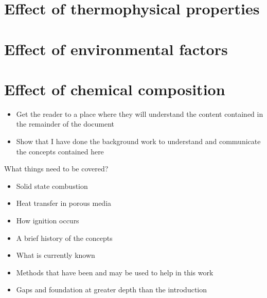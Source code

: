     \section{Effect of thermophysical properties}
    \section{Effect of environmental factors}
    \section{Effect of chemical composition}
    \begin{itemize}
        \item Get the reader to a place where they will understand the content contained in the remainder of the document
        \item Show that I have done the background work to understand and communicate the concepts contained here
    \end{itemize}
    What things need to be covered?
    \begin{itemize}
        \item Solid state combustion
        \item Heat transfer in porous media
        \item How ignition occurs 
        \item A brief history of the concepts
        \item What is currently known
        \item Methods that have been and may be used to help in this work
        \item Gaps and foundation at greater depth than the introduction
    \end{itemize}
    
     